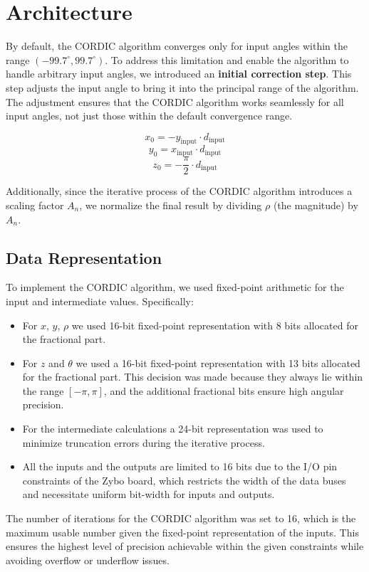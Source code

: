 \chapter{Architecture}


By default, the CORDIC algorithm converges only for input angles within the range \( (-99.7^\circ, 99.7^\circ) \).
To address this limitation and enable the algorithm to handle arbitrary input angles, we introduced an \textbf{initial correction step}. This step adjusts the input angle to bring it into the principal range of the algorithm. The adjustment ensures that the CORDIC algorithm works seamlessly for all input angles, not just those within the default convergence range.

\[
    x_0 = -y_{\text{input}} \cdot d_{\text{input}}
\]
\[
    y_0 =  x_{\text{input}} \cdot d_{\text{input}}
\]
\[
    z_0 = -\frac{\pi}{2} \cdot d_{\text{input}}
\]

Additionally, since the iterative process of the CORDIC algorithm introduces a scaling factor \( A_n \), we normalize the final result by dividing \( \rho \) (the magnitude) by \( A_n \).

\section{Data Representation}

To implement the CORDIC algorithm, we used fixed-point arithmetic for the input and intermediate values. Specifically:

\begin{itemize}
    \item For \( x \), \( y \), \( \rho \) we used 16-bit fixed-point representation with 8 bits allocated for the fractional part.
    \item For \( z \) and \( \theta \) we used a 16-bit fixed-point representation with 13 bits allocated for the fractional part. This decision was made because they always lie within the range \( [-\pi, \pi] \), and the additional fractional bits ensure high angular precision.
    \item For the intermediate calculations a 24-bit representation was used to minimize truncation errors during the iterative process.
    \item All the inputs and the outputs are limited to 16 bits due to the I/O pin constraints of the Zybo board, which restricts the width of the data buses and necessitate uniform bit-width for inputs and outputs.
\end{itemize}

The number of iterations for the CORDIC algorithm was set to 16, which is the maximum usable number given the fixed-point representation of the inputs. This ensures the highest level of precision achievable within the given constraints while avoiding overflow or underflow issues.